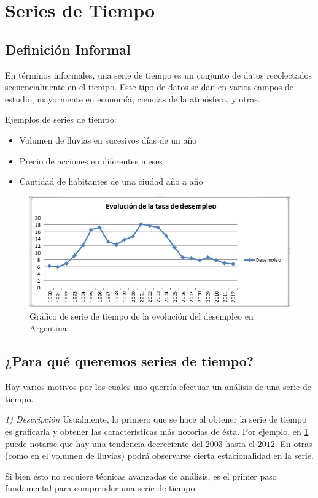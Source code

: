 \section{Series de Tiempo}

\subsection*{Definición Informal}
En términos informales, una serie de tiempo es un conjunto de datos recolectados secuencialmente en el tiempo. Este tipo de datos se dan en varios campos de estudio, mayormente en economía, ciencias de la atmósfera, y otras.

Ejemplos de series de tiempo:

\begin{itemize}
    \item Volumen de lluvias en sucesivos días de un año
    \item Precio de acciones en diferentes meses
    \item Cantidad de habitantes de una ciudad año a año
\end{itemize}

\begin{figure}
\centering
\includegraphics[width=15cm]{images/desocupacion.jpg}
\caption{Gráfico de serie de tiempo de la evolución del desempleo en Argentina \label{desocupacion}}
\end{figure}


\subsection*{¿Para qué queremos series de tiempo?}

Hay varios motivos por los cuales uno querría efectuar un análisis de una serie de tiempo.

\emph{1) Descripción} Usualmente, lo primero que se hace al obtener la serie de tiempo es graficarla y obtener las características más notorias de ésta. Por ejemplo, en \ref{desocupacion} puede notarse que hay una tendencia decreciente del $2003$ hasta el $2012$. En otras (como en el volumen de lluvias) podrá observarse cierta estacionalidad en la serie.

Si bien ésto no requiere técnicas avanzadas de análisis, es el primer paso fundamental para comprender una serie de tiempo.

